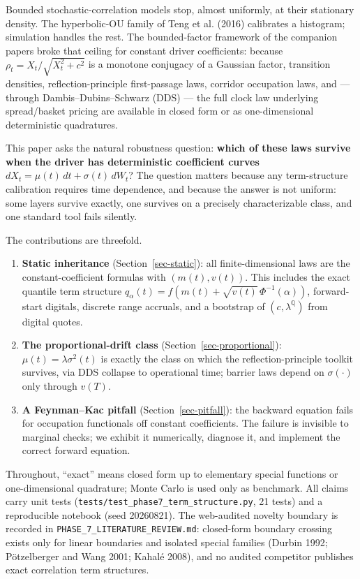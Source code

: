\documentclass[
  english,
  10pt,
  letterpaper,
  DIV=11,
  numbers=noendperiod]{scrartcl}
\providecommand{\tightlist}{%
  \setlength{\itemsep}{0pt}\setlength{\parskip}{0pt}}
\begin{document}
Bounded stochastic-correlation models stop, almost uniformly, at their
stationary density. The hyperbolic-OU family of Teng et al. (2016)
calibrates a histogram; simulation handles the rest. The bounded-factor
framework of the companion papers broke that ceiling for constant driver
coefficients: because \(\rho_t=X_t/\sqrt{X_t^2+c^2}\) is a monotone
conjugacy of a Gaussian factor, transition densities,
reflection-principle first-passage laws, corridor occupation laws, and
--- through Dambis--Dubins--Schwarz (DDS) --- the full clock law
underlying spread/basket pricing are available in closed form or as
one-dimensional deterministic quadratures.

This paper asks the natural robustness question: \textbf{which of these
laws survive when the driver has deterministic coefficient curves}
\(dX_t=\mu(t)\,dt+\sigma(t)\,dW_t\)? The question matters because any
term-structure calibration requires time dependence, and because the
answer is not uniform: some layers survive exactly, one survives on a
precisely characterizable class, and one standard tool fails silently.

The contributions are threefold.

\begin{enumerate}
\def\labelenumi{\arabic{enumi}.}
\tightlist
\item
  \textbf{Static inheritance} (Section~\ref{sec-static}): all
  finite-dimensional laws are the constant-coefficient formulas with
  \((m(t),v(t))\). This includes the exact quantile term structure
  \(q_\alpha(t)=f(m(t)+\sqrt{v(t)}\,
  \Phi^{-1}(\alpha))\), forward-start digitals, discrete range accruals,
  and a bootstrap of \((c,\lambda^{\mathbb Q})\) from digital quotes.
\item
  \textbf{The proportional-drift class}
  (Section~\ref{sec-proportional}): \(\mu(t)=\lambda\sigma^2(t)\) is
  exactly the class on which the reflection-principle toolkit survives,
  via DDS collapse to operational time; barrier laws depend on
  \(\sigma(\cdot)\) only through \(v(T)\).
\item
  \textbf{A Feynman--Kac pitfall} (Section~\ref{sec-pitfall}): the
  backward equation fails for occupation functionals off constant
  coefficients. The failure is invisible to marginal checks; we exhibit
  it numerically, diagnose it, and implement the correct forward
  equation.
\end{enumerate}

Throughout, ``exact'' means closed form up to elementary special
functions or one-dimensional quadrature; Monte Carlo is used only as
benchmark. All claims carry unit tests
(\texttt{tests/test\_phase7\_term\_structure.py}, 21 tests) and a
reproducible notebook (seed 20260821). The web-audited novelty boundary
is recorded in \texttt{PHASE\_7\_LITERATURE\_REVIEW.md}: closed-form
boundary crossing exists only for linear boundaries and isolated special
families (Durbin 1992; Pötzelberger and Wang 2001; Kahalé 2008), and no
audited competitor publishes exact correlation term structures.
\end{document}

